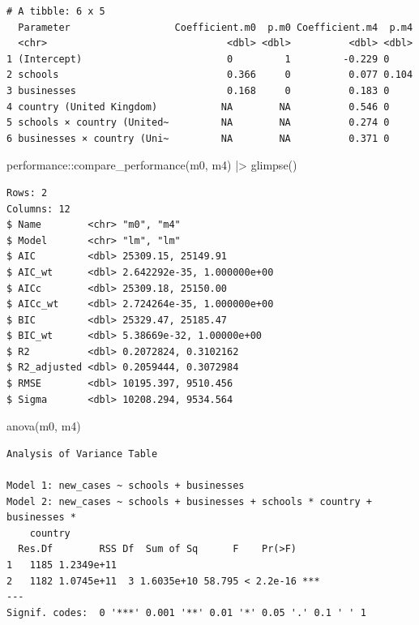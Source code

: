 \documentclass[
  letterpaper,
]{krantz}
\makeatletter
\newenvironment{Shaded}{\begin{snugshade}}{\end{snugshade}}
\newcommand{\FunctionTok}[1]{\textcolor[rgb]{0.28,0.35,0.67}{#1}}
\newcommand{\NormalTok}[1]{\textcolor[rgb]{0.00,0.23,0.31}{#1}}
\newcommand{\SpecialCharTok}[1]{\textcolor[rgb]{0.37,0.37,0.37}{#1}}
\newenvironment{kframe}{%
\medskip{}
\setlength{\fboxsep}{.8em}
 \def\at@end@of@kframe{}%
 \ifinner\ifhmode%
  \def\at@end@of@kframe{\end{minipage}}%
  \begin{minipage}{\columnwidth}%
 \fi\fi%
 \def\FrameCommand##1{\hskip\@totalleftmargin \hskip-\fboxsep
 \colorbox{shadecolor}{##1}\hskip-\fboxsep
     \hskip-\linewidth \hskip-\@totalleftmargin \hskip\columnwidth}%
 \MakeFramed {\advance\hsize-\width
   \@totalleftmargin\z@ \linewidth\hsize
   \@setminipage}}%
 {\par\unskip\endMakeFramed%
 \at@end@of@kframe}
\renewenvironment{Shaded}{\begin{kframe}}{\end{kframe}}
\makeatother
\begin{document}
\begin{verbatim}
# A tibble: 6 x 5
  Parameter                  Coefficient.m0  p.m0 Coefficient.m4  p.m4
  <chr>                               <dbl> <dbl>          <dbl> <dbl>
1 (Intercept)                         0         1         -0.229 0    
2 schools                             0.366     0          0.077 0.104
3 businesses                          0.168     0          0.183 0    
4 country (United Kingdom)           NA        NA          0.546 0    
5 schools × country (United~         NA        NA          0.274 0    
6 businesses × country (Uni~         NA        NA          0.371 0    
\end{verbatim}

\begin{Shaded}
\begin{Highlighting}[]
\NormalTok{performance}\SpecialCharTok{::}\FunctionTok{compare\_performance}\NormalTok{(m0, m4) }\SpecialCharTok{|\textgreater{}}
  \FunctionTok{glimpse}\NormalTok{()}
\end{Highlighting}
\end{Shaded}

\begin{verbatim}
Rows: 2
Columns: 12
$ Name        <chr> "m0", "m4"
$ Model       <chr> "lm", "lm"
$ AIC         <dbl> 25309.15, 25149.91
$ AIC_wt      <dbl> 2.642292e-35, 1.000000e+00
$ AICc        <dbl> 25309.18, 25150.00
$ AICc_wt     <dbl> 2.724264e-35, 1.000000e+00
$ BIC         <dbl> 25329.47, 25185.47
$ BIC_wt      <dbl> 5.38669e-32, 1.00000e+00
$ R2          <dbl> 0.2072824, 0.3102162
$ R2_adjusted <dbl> 0.2059444, 0.3072984
$ RMSE        <dbl> 10195.397, 9510.456
$ Sigma       <dbl> 10208.294, 9534.564
\end{verbatim}

\begin{Shaded}
\begin{Highlighting}[]
\FunctionTok{anova}\NormalTok{(m0, m4)}
\end{Highlighting}
\end{Shaded}

\begin{verbatim}
Analysis of Variance Table

Model 1: new_cases ~ schools + businesses
Model 2: new_cases ~ schools + businesses + schools * country + businesses * 
    country
  Res.Df        RSS Df  Sum of Sq      F    Pr(>F)    
1   1185 1.2349e+11                                   
2   1182 1.0745e+11  3 1.6035e+10 58.795 < 2.2e-16 ***
---
Signif. codes:  0 '***' 0.001 '**' 0.01 '*' 0.05 '.' 0.1 ' ' 1
\end{verbatim}
\end{document}
